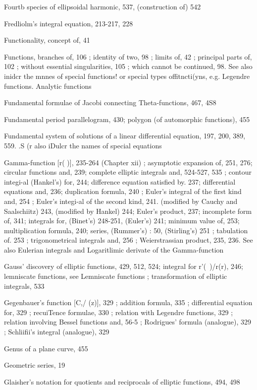 Fourtb species of ellipsoidal harmonic, 537, (construction of) 542

Fredliolm's integral equation, 213-217, 228

Functionality, concept of, 41

Functions, branches of, 106 ; identity of two, 98 ; limits of, 42 ; principal parts of, 102 ; without
essential singularities, 105 ; which cannot be continued, 98. See also inidcr the mnnes of
special functions! or special types offitncti(yns, e.g. Legendre functions. Analytic functions

Fundamental formulae of Jacobi connecting Theta-functions, 467, 4S8

Fundamental period parallelogram, 430; polygon (of automorphic functions), 455

Fundamental system of solutions of a linear differential equation, 197, 200, 389, 559. .S (r also
iDulcr the names of special equations

Gamma-function [r( )], 235-264 (Chapter xii) ; asymptotic expansion of, 251, 276; circular
functions and, 239; complete elliptic integrals and, 524-527, 535 ; contour integi-al (Hankel's)
for, 244; difference equation satisfied by. 237; differential equations and, 236; duplication
formula, 240 ; Euler's integral of the first kind and, 254 ; Euler's integi-al of the second
kind, 241. (modified by Cauchy and Saalschiitz) 243, (modified by Hankel) 244; Euler's
product, 237; incomplete form of, 341; integrals for, (Binet's) 248-251, (Euler's) 241;
minimum value of, 253; multiplication formula, 240; series, (Rummer's) : 50, (Stirling's)
251 ; tabulation of. 253 ; trigonometrical integrals and, 256 ; Weierstrassian product, 235,
236. See also Eulerian integrals and Logaritlimic derivate of the Gamma-function

Gauss' discovery of elliptic functions, 429, 512, 524; integral for r'(~)/r(r), 246; lemniscate
functions, see Lemniscate functions ; transformation of elliptic integrals, 533

Gegenbauer's function [C,/ (z)], 329 ; addition formula, 335 ; differential equation for, 329 ;
recuiTence formulae, 330 ; relation with Legendre functions, 329 ; relation involving Bessel
functions and, 56-5 ; Rodrigues' formula (analogue), 329 ; Schliifii's integral (analogue), 329

Genus of a plane curve, 455

Geometric series, 19

Glaisher's notation for quotients and reciprocals of elliptic functions, 494, 498

